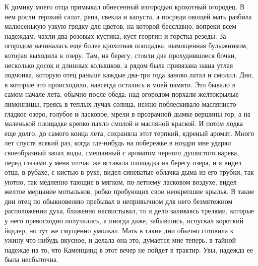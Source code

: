К домику моего отца  примыкал обнесенный изгородью крохотный огородец.
В  нем  росли  терпкий  салат,  репа,  свекла  и  капуста,  а  посреди
овощей мать  разбила малюсенькую узкую  грядку для цветов,  на которой
бесславно,  вопреки всем  надеждам,  чахли два  розовых кустика,  куст
георгин и горстка  резеды. За огородом начиналась  еще более крохотная
площадка,  вымощенная булыжником,  которая выходила  к озеру.  Там, на
берегу,  стояли две  прохудившиеся  бочки, несколько  досок и  длинных
колышков, а  рядом была  привязана наша  утлая лодчонка,  которую отец
раньше каждые два-три  года заново латал и смолил. Дни,  в которые это
происходило,  навсегда остались  в  моей памяти.  Это  бывало в  самом
начале  лета, обычно  после  обеда; над  огородом порхали  желтокрылые
лимонницы,   греясь  в   теплых  лучах   солнца,  нежно   поблескивало
маслянисто-гладкое озеро, голубое и ласковое, мрели в прозрачной дымке
вершины гор,  а на маленькой  площадке крепко пахло смолой  и масляной
краской. И потом лодка еще долго, до самого конца лета, сохраняла этот
терпкий, ядреный аромат. Много лет спустя всякий раз, когда где-нибудь
на побережье в ноздри мне  ударял своеобразный запах воды, смешанный с
ароматом  черного душистого  варева, перед  глазами у  меня тотчас  же
вставала площадка на берегу озера, и  я видел отца, в рубахе, с кистью
в руке,  видел синеватые облачка  дыма из  его трубки, так  уютно, так
медленно тающие  в мягком,  по-летнему ласковом воздухе,  видел желтое
мерцание мотыльков,  робко пробующих  свои неокрепшие крылья.  В такие
дни отец  по обыкновению пребывал  в непривычном для  него безмятежном
расположении духа, блаженно насвистывал,  то и дело заливаясь трелями,
которые  у  него превосходно  получались,  а  иногда даже,  забывшись,
испускал короткий йодлер, но тут же смущенно умолкал. Мать в такие дни
обычно готовила к ужину что-нибудь вкусное, и делала она это, думается
мне теперь,  в тайной  надежде на  то, что Каменцинд  в этот  вечер не
пойдет в трактир. Увы, надежда ее была несбыточна.

